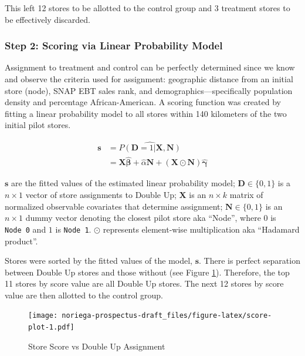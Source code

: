 \documentclass[12pt,letterpaperpaper,]{book}
\begin{document}
This left 12 stores to be allotted to the control group and 3 treatment
stores to be effectively discarded.

\subsubsection{Step 2: Scoring via Linear Probability
Model}\label{step-2-scoring-via-linear-probability-model}

Assignment to treatment and control can be perfectly determined since we
know and observe the criteria used for assignment: geographic distance
from an initial store (node), SNAP EBT sales rank, and
demographics---specifically population density and percentage
African-American. A scoring function was created by fitting a linear
probability model to all stores within 140 kilometers of the two initial
pilot stores.

\[
\begin{aligned}
  \bm{s}  &= \widehat{P(\mathbf{D} = 1 | \bm{X}, \bm{N})} \\
          &= \mathbf{X} \bm{\hat \beta} + \hat \alpha \mathbf{N} + \left (\mathbf{X} \odot \mathbf{N} \right ) \bm{\hat \gamma}
\end{aligned}
\]

\(\bm{s}\) are the fitted values of the estimated linear probability
model; \(\mathbf{D} \in \{0,1 \}\) is a \(n \times 1\) vector of store
assignments to Double Up; \(\mathbf{X}\) is an \(n \times k\) matrix of
normalized observable covariates that determine assignment;
\(\mathbf{N} \in \{0, 1 \}\) is an \(n \times 1\) dummy vector denoting
the closest pilot store aka ``Node'', where \(0\) is \texttt{Node\ 0}
and \(1\) is \texttt{Node\ 1}. \(\odot\) represents element-wise
multiplication aka ``Hadamard product''.

Stores were sorted by the fitted values of the model, \(\bm{s}\). There
is perfect separation between Double Up stores and those without (see
Figure \ref{fig:score-plot}). Therefore, the top 11 stores by score
value are all Double Up stores. The next 12 stores by score value are
then allotted to the control group.

\begin{figure}
\centering
\texttt{[image: noriega-prospectus-draft\_files/figure-latex/score-plot-1.pdf]}
\caption{\label{fig:score-plot}Store Score vs Double Up Assignment}
\end{figure}
\end{document}

